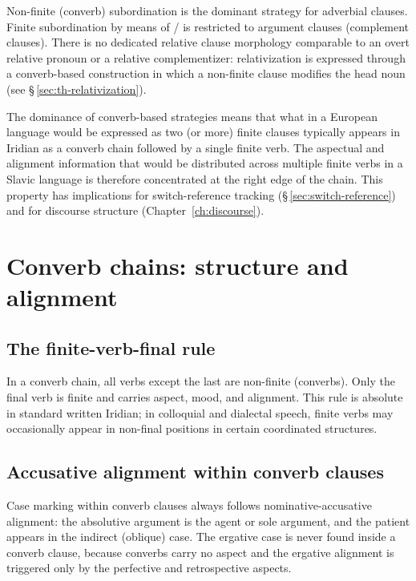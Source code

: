 Non-finite (converb) subordination is the dominant strategy for adverbial
clauses. Finite subordination by means of / is restricted
to argument clauses (complement clauses). There is no dedicated relative
clause morphology comparable to an overt relative pronoun or a relative
complementizer: relativization is expressed through a converb-based
construction in which a non-finite clause modifies the head noun (see
§\,\ref{sec:th-relativization}).

The dominance of converb-based strategies means that what in a European
language would be expressed as two (or more) finite clauses typically
appears in Iridian as a converb chain followed by a single finite verb. The
aspectual and alignment information that would be distributed across multiple
finite verbs in a Slavic language is therefore concentrated at the right edge
of the chain. This property has implications for switch-reference tracking
(§\,\ref{sec:switch-reference}) and for discourse structure
(Chapter~\ref{ch:discourse}).

\section{Converb chains: structure and alignment}\label{sec:converb-chains}

\subsection{The finite-verb-final rule}

In a converb chain, all verbs except the last are non-finite (converbs). Only the final verb is finite and carries aspect, mood, and alignment. This rule is absolute in standard written Iridian; in colloquial and dialectal speech, finite verbs may occasionally appear in non-final positions in certain coordinated structures.

\subsection{Accusative alignment within converb clauses}

Case marking within converb clauses always follows nominative-accusative alignment: the absolutive argument is the agent or sole argument, and the patient appears in the indirect (oblique) case. The ergative case is never found inside a converb clause, because converbs carry no aspect and the ergative alignment is triggered only by the perfective and retrospective aspects.

